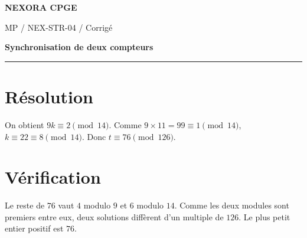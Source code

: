 \documentclass[11pt,a4paper]{article}
\begin{document}
{\small\bfseries\color{nexorablue} NEXORA CPGE}\par
{\small MP / NEX-STR-04 / Corrigé}\par
{\LARGE\bfseries Synchronisation de deux compteurs}\par
\vspace{0.25em}\hrule\vspace{0.6em}

\section*{Résolution}
On obtient $9k\equiv2\pmod{14}$. Comme $9\times11=99\equiv1\pmod{14}$, $k\equiv22\equiv8\pmod{14}$. Donc $t\equiv76\pmod{126}$.

\section*{Vérification}
Le reste de $76$ vaut $4$ modulo $9$ et $6$ modulo $14$. Comme les deux modules sont premiers entre eux, deux solutions diffèrent d’un multiple de $126$. Le plus petit entier positif est $76$.
\end{document}
